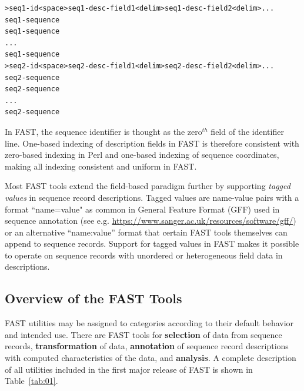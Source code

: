 \documentclass{frontiersSCNS} %
\begin{document}
\begin{verbatim}
>seq1-id<space>seq1-desc-field1<delim>seq1-desc-field2<delim>...
seq1-sequence
seq1-sequence
...
seq1-sequence
>seq2-id<space>seq2-desc-field1<delim>seq2-desc-field2<delim>...
seq2-sequence
seq2-sequence
...
seq2-sequence
\end{verbatim}

In FAST, the sequence identifier is thought as the zero$^{th}$ field
of the identifier line. One-based indexing of description fields in
FAST is therefore consistent with zero-based indexing in Perl and
one-based indexing of sequence coordinates, making all indexing
consistent and uniform in FAST.

Most FAST tools extend the field-based paradigm further by supporting
{\it tagged values} in sequence record descriptions. Tagged values are
name-value pairs with a format ``name=value" as common in General
Feature Format (GFF) used in sequence annotation (see
e.g. \url{https://www.sanger.ac.uk/resources/software/gff/}) or an
alternative ``name:value'' format that certain FAST tools themselves
can append to sequence records. Support for tagged values in FAST makes it
possible to operate on sequence records with unordered or
heterogeneous field data in descriptions. 

\subsection{Overview of the FAST Tools}

FAST utilities may be assigned to categories according to their
default behavior and intended use. There are FAST tools for {\bf
  selection} of data from sequence records, {\bf transformation} of
data, {\bf annotation} of sequence record descriptions with computed
characteristics of the data, and {\bf analysis}.  A complete
description of all utilities included in the first major release of
FAST is shown in Table~\ref{tab:01}.
\end{document}
